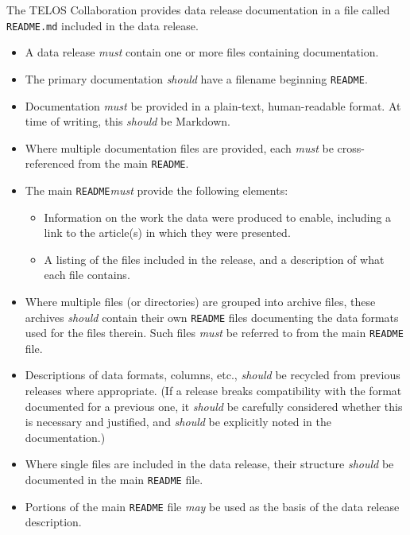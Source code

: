 \documentclass{article}
\newcommand\rfcword[1]{\emph{#1}\xspace}
\newcommand\must{\rfcword{must}}
\newcommand\should{\rfcword{should}}
\newcommand\may{\rfcword{may}}
\newcommand\filename[1]{\texttt{#1}\xspace}
\newcommand\readme{\filename{README}}
\begin{document}
The TELOS Collaboration provides data release documentation in a file called \filename{README.md}
included in the data release.

\begin{itemize}
  \item
        A data release \must contain one or more files containing documentation.
  \item
        The primary documentation \should have a filename beginning \readme.
  \item
        Documentation \must be provided in a plain-text, human-readable format.
        At time of writing,
        this \should be Markdown.
  \item
        Where multiple documentation files are provided,
        each \must be cross-referenced from the main \readme.
  \item
        The main \readme \must provide the following elements:
        \begin{itemize}
          \item
                Information on the work the data were produced to enable,
                including a link to the article(s) in which they were presented.
          \item
                A listing of the files included in the release,
                and a description of what each file contains.
        \end{itemize}
  \item
        Where multiple files (or directories) are grouped into archive files,
        these archives \should contain their own \readme files
        documenting the data formats used for the files therein.
        Such files \must be referred to from the main \readme file.
  \item
        Descriptions of data formats, columns, etc.,
        \should be recycled from previous releases where appropriate.
        (If a release breaks compatibility with the format documented for a previous one,
        it \should be carefully considered whether this is necessary and justified,
        and \should be explicitly noted in the documentation.)
  \item
        Where single files are included in the data release,
        their structure \should be documented in the main \readme file.
  \item
        Portions of the main \readme file \may be used as
        the basis of the data release description.
\end{itemize}
\end{document}
